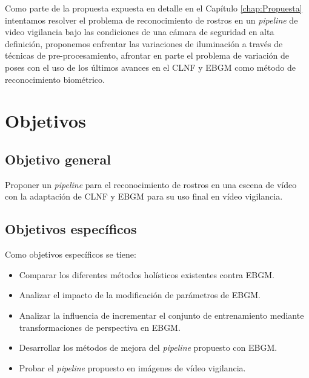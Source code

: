 
Como parte de la propuesta expuesta en detalle en el Capítulo \ref{chap:Propuesta} intentamos resolver el problema de reconocimiento de rostros en un \textit{pipeline} de video vigilancia bajo las condiciones de una cámara de seguridad en alta definición, proponemos enfrentar las variaciones de iluminación a través de técnicas de pre-procesamiento, afrontar en parte el problema de variación de poses con el uso de los últimos avances en el \acf{CLNF} y \acf{EBGM} como método de reconocimiento biométrico. 


\section{Objetivos}\label{scc:Objetivos}

\subsection{Objetivo general}
Proponer un \textit{pipeline} para el reconocimiento de rostros en una escena de vídeo con la adaptación de \acf{CLNF} y \acf{EBGM} para su uso final en vídeo vigilancia.

\subsection{Objetivos específicos}
Como objetivos específicos se tiene:
\begin{itemize}
\item Comparar los diferentes métodos holísticos existentes contra \ac{EBGM}.
\item Analizar el impacto de la modificación de parámetros de \ac{EBGM}.
\item Analizar la influencia de incrementar el conjunto de entrenamiento mediante transformaciones de perspectiva en \ac{EBGM}.
\item Desarrollar los métodos de mejora del \textit{pipeline} propuesto con \ac{EBGM}.
\item Probar el \textit{pipeline} propuesto en imágenes de vídeo vigilancia.
\end{itemize}

